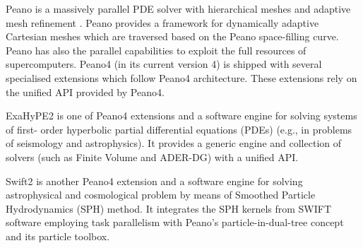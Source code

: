 Peano is a massively parallel PDE solver with hierarchical meshes and adaptive mesh refinement \cite{ref1}. Peano provides a framework for dynamically adaptive
Cartesian meshes which are traversed based on the Peano space-filling curve. Peano has also the parallel capabilities to exploit the full resources of supercomputers. Peano4 (in its current version 4) is shipped with several specialised extensions which follow Peano4 architecture. These extensions rely on the unified API provided by Peano4.

ExaHyPE2 is one of Peano4 extensions and a software engine for solving systems of first-
order hyperbolic partial differential equations (PDEs) \cite{REINARZ2020107251} (e.g., in problems of seismology and astrophysics). It provides a generic engine and collection of solvers (such as Finite Volume and ADER-DG) with a unified API.

Swift2 is another Peano4 extension and a software engine for solving astrophysical and cosmological problem by means of Smoothed Particle Hydrodynamics (SPH) method. It integrates the SPH kernels from SWIFT software employing task parallelism with Peano's particle-in-dual-tree concept and its particle toolbox.